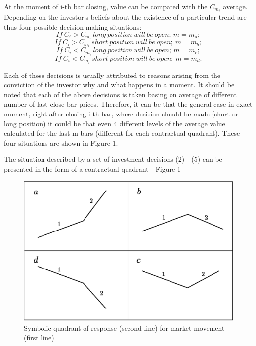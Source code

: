\documentclass{tewiart}
\begin{document}
At the moment of i-th bar closing, value can be compared with the $C_{m_{i}}$ average. Depending on the investor's beliefs about the existence of a particular trend are thus four possible decision-making situations:
\begin{equation} If\ C_i  > C_{m_{i}}\   long\ position\ will\ be\ open;\ m=m_a; \end{equation}
\begin{equation} If\ C_i  > C_{m_{i}}\   short\ position\ will\ be\ open;\ m=m_b; \end{equation}
\begin{equation} If\ C_i  < C_{m_{i}}\   long\ position\ will\ be\ open;\ m=m_c; \end{equation}
\begin{equation} If\ C_i  < C_{m_{i}}\   short\ position\ will\ be\ open;\ m=m_d. \end{equation}

Each of these decisions is usually attributed to reasons arising from the conviction of the investor why and what happens in a moment. It should be noted that each of the above decisions is taken basing on average of different number of last close bar prices. Therefore, it can be that the general case in exact moment, right after closing i-th bar, where decision should be made (short or long position) it could be that even 4 different levels of  the average value calculated for the last m bars (different for each contractual quadrant). These four situations are shown in Figure 1.

The situation described by a set of investment decisions (2) - (5) can be presented in the form of a contractual quadrant - Figure 1


\begin{figure}[h!]
 \centering
 \includegraphics[width=\textwidth]{Rysunek0_all2.eps}
 \caption{Symbolic quadrant of response (second line) for market movement (first line)}
\end{figure}
\FloatBarrier
\end{document}
